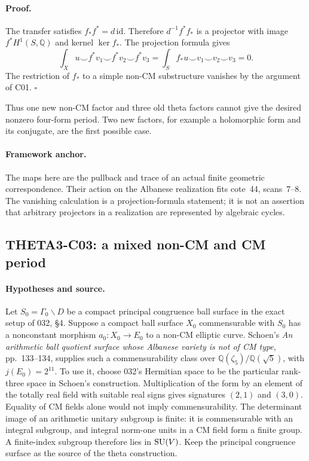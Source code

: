 \documentclass[11pt]{article}
\newcommand{\Q}{\mathbb Q}\newcommand{\C}{\mathbb C}\newcommand{\Z}{\mathbb Z}\newcommand{\R}{\mathbb R}\newcommand{\A}{\mathbb A}\newcommand{\OO}{\mathcal O}
\theoremstyle{definition}\newtheorem{definition}[theorem]{Definition}\newtheorem{remark}[theorem]{Remark}
\begin{document}
\paragraph{Proof.}
The transfer satisfies $f_*f^*=d\,\mathrm{id}$. Therefore
$d^{-1}f^*f_*$ is a projector with image $f^*H^1(S,\Q)$ and kernel
$\ker f_*$. The projection formula gives
\[
 \int_Xu\smile f^*v_1\smile f^*v_2\smile f^*v_3
 =\int_S f_*u\smile v_1\smile v_2\smile v_3=0.
\]
The restriction of $f_*$ to a simple non-CM substructure vanishes by
the argument of C01. $\square$

Thus one new non-CM factor and three old theta factors cannot give
the desired nonzero four-form period. Two new factors, for example a
holomorphic form and its conjugate, are the first possible case.

\paragraph{Framework anchor.}
The maps here are the pullback and trace of an actual finite geometric
correspondence.  Their action on the Albanese realization fits cote~44,
scans~7--8.  The vanishing calculation is a projection-formula statement;
it is not an assertion that arbitrary projectors in a realization are
represented by algebraic cycles.

\subsection{THETA3-C03: a mixed non-CM and CM period}\label{C03}

\paragraph{Hypotheses and source.}
Let $S_0=\Gamma_0\backslash D$ be a compact principal congruence
ball surface in the exact setup of 032, \S4. Suppose a compact ball
surface $X_0$ commensurable with $S_0$ has a nonconstant morphism
$a_0:X_0\to E_0$ to a non-CM elliptic curve.
Schoen's \emph{An arithmetic ball quotient surface whose Albanese
variety is not of CM type}, pp.~133--134, supplies such a
commensurability class over $\Q(\zeta_5)/\Q(\sqrt5)$, with
$j(E_0)=2^{11}$. To use it, choose 032's Hermitian space to be the
particular rank-three space in Schoen's construction. Multiplication
of the form by an element of the totally real field with suitable
real signs gives signatures $(2,1)$ and $(3,0)$. Equality of CM
fields alone would not imply commensurability. The determinant image
of an arithmetic unitary subgroup is finite: it is commensurable
with an integral subgroup, and integral norm-one units in a CM field
form a finite group. A finite-index subgroup therefore lies in
$\operatorname{SU}(V)$. Keep the principal congruence surface as the source of the
theta construction.
\end{document}
